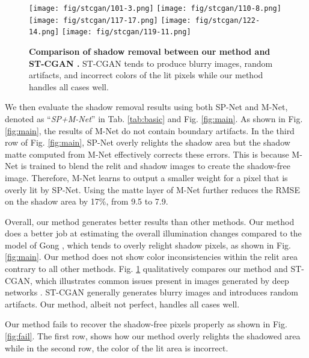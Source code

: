 \def\subboxsize{0.22\subFigSzab}
\begin{figure}[]
 \centering
\texttt{[image: fig/stcgan/101-3.png]}
\texttt{[image: fig/stcgan/110-8.png]}
       \texttt{[image: fig/stcgan/117-17.png]}
\texttt{[image: fig/stcgan/122-14.png]}
\texttt{[image: fig/stcgan/119-11.png]} 
\makebox[\subboxsize]{Input}
    \makebox[\subboxsize]{Wang \etal \cite{Wang_2018_CVPR}}
        \makebox[\subboxsize]{Ours}
    \makebox[\subboxsize]{GT}
    \caption{\textbf{Comparison of shadow removal between our method and ST-CGAN \cite{Wang_2018_CVPR}.} ST-CGAN tends to produce blurry images, random artifacts, and incorrect colors of the lit pixels while our method handles all cases well. 
    }
    \label{fig:stcgan}
\end{figure}


We then evaluate the shadow removal results using both SP-Net and M-Net, denoted as 
``\textit{SP+M-Net}'' in Tab. \ref{tab:basic} and Fig. \ref{fig:main}. As shown in Fig. \ref{fig:main}, the results of M-Net do not contain  boundary artifacts. 
In the third row of Fig. \ref{fig:main}, SP-Net overly relights the shadow area but the shadow matte computed from M-Net effectively corrects these errors. This is because M-Net is trained to blend the relit and shadow images  to create the shadow-free image. Therefore, M-Net  learns to output a smaller weight for a pixel that is overly lit by SP-Net.
Using the matte layer of M-Net further reduces the RMSE on the shadow area by 17\%, from 9.5 to 7.9. 

Overall, our method generates better results than other methods.  Our method does a better job at estimating the overall illumination changes compared to the model of Gong \etal, which tends to overly relight  shadow pixels, as shown in Fig. \ref{fig:main}. Our method does not show color inconsistencies within the relit area contrary to all other methods.  Fig. \ref{fig:stcgan}  qualitatively compares  our method and ST-CGAN, which illustrates common issues present in images generated by deep networks \cite{isola2017image,zhang2016colorful}. ST-CGAN generally generates blurry images and introduces random artifacts. Our method, albeit not perfect, handles all cases well.  

Our method fails to recover the shadow-free pixels properly as shown  in Fig. \ref{fig:fail}. The first row, shows how our method overly relights the shadowed area while in the second row, the color of the lit area is incorrect. 

